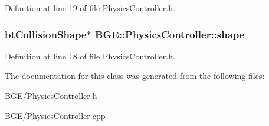 Definition at line 19 of file Physics\-Controller.\-h.

\hypertarget{class_b_g_e_1_1_physics_controller_afa0cda526c5c9f57a678bb46867801a1}{
\subsubsection[{shape}]{\setlength{\rightskip}{0pt plus 5cm}bt\-Collision\-Shape$\ast$ B\-G\-E\-::\-Physics\-Controller\-::shape}}\label{class_b_g_e_1_1_physics_controller_afa0cda526c5c9f57a678bb46867801a1}


Definition at line 18 of file Physics\-Controller.\-h.



The documentation for this class was generated from the following files\-:\begin{DoxyCompactItemize}
\item 
B\-G\-E/\hyperlink{_physics_controller_8h}{Physics\-Controller.\-h}\item 
B\-G\-E/\hyperlink{_physics_controller_8cpp}{Physics\-Controller.\-cpp}\end{DoxyCompactItemize}
